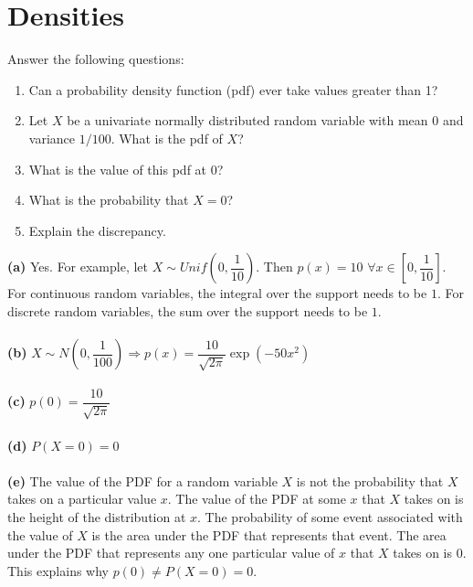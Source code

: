 \documentclass[submit]{harvardml}
\begin{document}
\section*{Densities}
\begin{problem}
Answer the following questions:
\begin{enumerate}[label=(\alph*)]
  \item Can a probability density function (pdf) ever take values greater than 1?
  \item Let $X$ be a univariate normally distributed random variable with mean 0
        and variance $1/100$. What is the pdf of $X$?
  \item What is the value of this pdf at 0?
  \item What is the probability that $X = 0$?
  \item Explain the discrepancy.
\end{enumerate}
\end{problem}




\textbf{(a)} Yes. For example, let $X\sim Unif\left( 0,\dfrac {1}{10}\right)$. Then $p\left( x\right) =10$ $\forall x\in\left[ 0,\dfrac {1}{10}\right]$. For continuous random variables, the integral over the support needs to be $1$. For discrete random variables, the sum over the support needs to be $1$.\\\\



\textbf{(b)} $X\sim N\left( 0,\dfrac {1}{100}\right) \Rightarrow p\left( x\right) =\dfrac {10}{\sqrt {2\pi}}\exp\left( -50x^{2}\right)$\\\\



\textbf{(c)} $p\left( 0\right) =\dfrac {10}{\sqrt {2\pi}}$\\\\ 



\textbf{(d)} $P\left( X=0\right) =0$\\\\



\textbf{(e)} The value of the PDF for a random variable $X$ is not the probability that $X$ takes on a particular value $x$. The value of the PDF at some $x$ that $X$ takes on is the height of the distribution at $x$. The probability of some event associated with the value of $X$ is the area under the PDF that represents that event. The area under the PDF that represents any one particular value of $x$ that $X$ takes on is $0$. This explains why $p\left( 0\right) \neq P\left( X=0\right) =0$.
\end{document}

